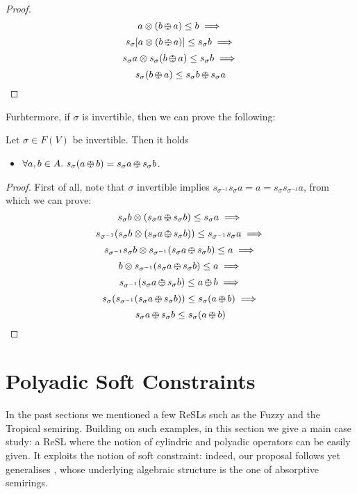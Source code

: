 \documentclass{llncs}
\def\odiv{\, {\ominus\hspace{-7.7pt} \div} \,}
\begin{document}
\begin{proof}
\[ a \otimes (b \odiv a) \leq b \implies \]
\[ s_\sigma [a \otimes (b \odiv a)] \leq s_\sigma b \implies \]
\[ s_\sigma a \otimes s_\sigma(b \odiv a) \leq s_\sigma b \implies \]
\[ s_\sigma (b \odiv a) \leq s_\sigma b \odiv s_\sigma a \]
\end{proof}

Furhtermore, if $\sigma$ is invertible, then we can prove the following:

\begin{lemma}
Let $\sigma \in F(V)$ be invertible. Then it holds
\begin{itemize}
\item $\forall a,b \in A.\ s_\sigma (a \odiv b) = s_\sigma a \odiv s_\sigma b$.
\end{itemize}
\end{lemma}

\begin{proof}
First of all, note that $\sigma$ invertible implies $s_{\sigma^{-1}} s_{\sigma} a = a 
= s_{\sigma} s_{\sigma^{-1}} a$, from which we can prove:
\[ s_\sigma b \otimes (s_\sigma a \odiv s_\sigma b) \leq s_\sigma a  \implies \]
\[ s_{\sigma^{-1}} (s_\sigma b \otimes (s_\sigma a \odiv s_\sigma b))
\leq s_{\sigma^{-1}} s_\sigma a  \implies \]
\[ s_{\sigma^{-1}} s_\sigma b \otimes s_{\sigma^{-1}} (s_\sigma a \odiv s_\sigma b) \leq a \implies \]
\[ b \otimes s_{\sigma^{-1}} (s_\sigma a \odiv s_\sigma b) \leq a \implies \]
\[ s_{\sigma^{-1}} (s_\sigma a \odiv s_\sigma b) \leq a \odiv b \implies \]
\[ s_\sigma (s_{\sigma^{-1}} (s_\sigma a \odiv s_\sigma b)) \leq s_\sigma (a \odiv b) \implies \]
\[ s_\sigma a \odiv s_\sigma b \leq s_\sigma (a \odiv b) \]
\end{proof}

\section{Polyadic Soft Constraints}\label{sec:softconstraints}
\label{subsec:inst} 
In the past sections we mentioned a few ReSLs such as 
the Fuzzy 
and the Tropical semiring.
%
Building on such examples, in this section we give a main case study: a ReSL 
where the notion of cylindric and polyadic operators can be easily given.
It exploits the notion
of soft constraint: indeed, our proposal follows yet generalises \cite{scc},
whose underlying algebraic structure is the one of absorptive semirings.
\end{document}

